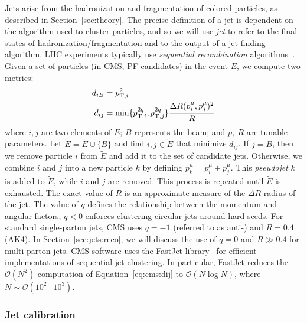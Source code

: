 Jets arise from the hadronization and fragmentation of colored particles, as described in Section~\ref{sec:theory}.
The precise definition of a jet is dependent on the algorithm used to cluster particles, and so we will use \emph{jet} to refer to the final states of hadronization/fragmentation and to the output of a jet finding algorithm.
LHC experiments typically use \emph{sequential recombination} algorithms~\cite{antikt,kt,ca}.
Given a set of particles (in CMS, PF candidates) in the event $E$, we compute two metrics:
\begin{align}
    d_{iB} &= p_{\mathrm{T},i}^2 \nonumber \\ 
    d_{ij} &= \min\{p_{\mathrm{T},i}^{2q}, p_{\mathrm{T},j}^{2q}\} \frac{\Delta R(p_i^\mu, p_j^\mu)^2}{R}
    \label{eq:cms:dij}
\end{align}
where $i,j$ are two elements of $E$; $B$ represents the beam; and $p,~R$ are tunable parameters.
Let $\tilde E = E \cup \{B\}$ and find $i,j\in \tilde E$ that minimize $d_{ij}$.
If $j=B$, then we remove particle $i$ from $\tilde E$ and add it to the set of candidate jets.
Otherwise, we combine $i$ and $j$ into a new particle $k$ by defining $p_k^\mu = p_i^\mu + p_j^\mu$.
This \emph{pseudojet} $k$ is added to $\tilde E$, while $i$ and $j$ are removed.
This process is repeated until $\tilde E$ is exhausted.
The exact value of $R$ is an approximate measure of the $\Delta R$ radius of the jet. 
The value of $q$ defines the relationship between the momentum and angular factors; $q<0$  enforces clustering circular jets around hard seeds.
For standard single-parton jets, CMS uses $q=-1$ (referred to as anti-\kt) and $R=0.4$ (AK4).
In Section~\ref{sec:jets:reco}, we will discuss the use of $q=0$ and $R\gg 0.4$ for multi-parton jets. 
CMS software uses the FastJet library~\cite{fastjet} for efficient implementations of sequential jet clustering.
In particular, FastJet reduces the $\mathcal{O}(N^2)$ computation of Equation~\ref{eq:cms:dij} to $\mathcal{O}(N\log N)$, where $N\sim\mathcal{O}(10^{2}\mathrm{-}10^3)$. 

\subsubsection{Jet calibration}

